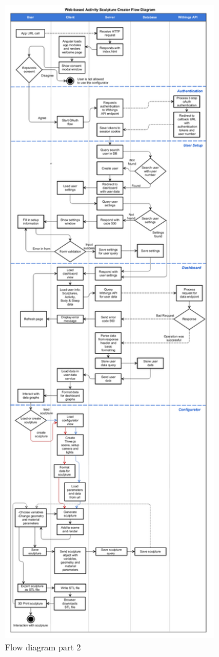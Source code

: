 \documentclass[../medieninformatik-arbeit.tex]{subfiles}
\begin{document}
\begin{figure}
\captionsetup{width=\textwidth}
\begin{center}
  \includegraphics[width=0.82\textwidth]{Configurator/img/flow_diagram_2}
  \caption{Flow diagram part 2}
\label{fig:flowdiagram2}
\end{center}
\end{figure}
\end{document}
